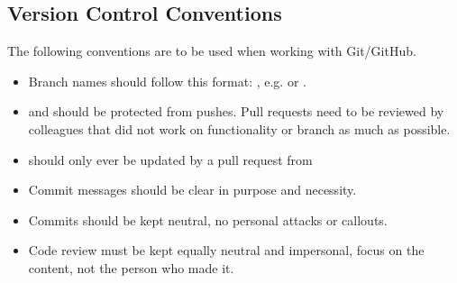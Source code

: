 \subsection{Version Control Conventions}
The following conventions are to be used when working with Git/GitHub.
\begin{itemize}
\item Branch names should follow this format: , e.g.  or .
\item {} and  should be protected from pushes. Pull requests need to be reviewed by colleagues that did not work on functionality or branch as much as possible.
\item {} should only ever be updated by a pull request from 
\item Commit messages should be clear in purpose and necessity.
\item Commits should be kept neutral, no personal attacks or callouts.
\item Code review must be kept equally neutral and impersonal, focus on the content, not the person who made it.
\end{itemize}
\newpage
